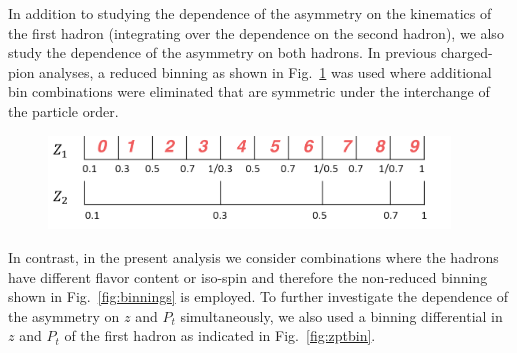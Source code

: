 In addition to studying the dependence of the asymmetry on the kinematics of the first hadron (integrating over the dependence on the second hadron),  we also study the dependence of the asymmetry on both hadrons. 
In previous charged-pion analyses, a reduced binning  as shown in Fig.~\ref{fig:comz_mark} was used where additional bin combinations were eliminated that are symmetric under the interchange of the particle order.
\begin{figure}[H]
\centering
\begin{minipage}{.5\textwidth}
  \centering
  \includegraphics[width=0.95\textwidth,natwidth=610,natheight=642]{figure_dataselection/zbin.pdf}
  \label{fig:comz_mark}
\end{minipage}%
\end{figure}

In contrast, in the present analysis we consider combinations where the hadrons have different flavor content or iso-spin and therefore
the non-reduced  binning shown in Fig.~\ref{fig:binnings} is employed. To further investigate the dependence of the asymmetry on $z$ and $P_t$ simultaneously, we also used a binning differential in $z$ and $P_t$ of the first hadron as indicated in Fig.~\ref{fig:zptbin}.   

